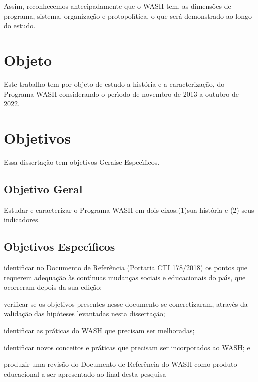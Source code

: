 \documentclass[
12pt,		%
openright,	%
twoside,  %
a4paper,			%
chapter=TITLE,		%
english,			%
french,				%
spanish,			%
brazil				%
]{USPSC-classe/USPSC}
\begin{document}
Assim, reconhecemos antecipadamente que o WASH tem, as dimens\~oes de programa, sistema, organiza\c{c}\~ao e protopol\'{\i}tica, o que ser\'a demonstrado ao longo do estudo.








\section[Objeto]{Objeto}\label{Objeto}
Este trabalho tem por objeto de estudo a hist\'oria e a caracteriza\c{c}\~ao, do Programa WASH considerando o per\'{\i}odo de novembro de 2013 a outubro de 2022.








\section[Objetivos]{Objetivos}\label{Objetivos}
Essa disserta\c{c}\~ao tem objetivos  \textquotedbl Gerais\textquotedbl  e \textquotedbl Espec\'{\i}ficos\textquotedbl .








\subsection[Objetivo Geral]{Objetivo Geral}\label{Objetivo Geral}
Estudar e caracterizar o Programa WASH em dois eixos:(1)sua hist\'oria e (2) seus indicadores.








\subsection[Objetivos Espec\'{\i}ficos]{Objetivos Espec\'{\i}ficos}\label{Objetivos Espec\'{\i}ficos}










\begin{alineas}
\item identificar no Documento de Refer\^encia (Portaria CTI 178/2018) os pontos que requerem adequa\c{c}\~ao \`as cont\'{\i}nuas mudan\c{c}as sociais e educacionais do pa\'{\i}s, que ocorreram depois da sua edi\c{c}\~ao;
\item verificar se os objetivos presentes nesse documento se concretizaram, atrav\'es da valida\c{c}\~ao das hip\'oteses levantadas nesta disserta\c{c}\~ao;
\item identificar as pr\'aticas do WASH que precisam ser melhoradas;
\item identificar novos conceitos e pr\'aticas que precisam ser incorporados ao WASH; e
\item produzir uma revis\~ao do Documento de Refer\^encia do WASH como produto educacional a ser apresentado ao final desta pesquisa
\end{alineas}
\end{document}
